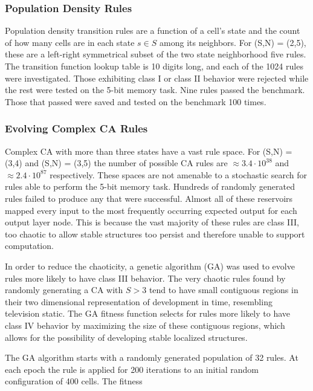 \documentclass{elsarticle}
\begin{document}
\begin{multicols}{2}
\subsubsection{Population Density Rules}
Population density transition rules are a function of a cell's state and the 
    count of how many cells are in each state $s \in S$ among its neighbors. 
    For (S,N) = (2,5), these are a left-right symmetrical subset of the two 
    state neighborhood five rules. The transition function lookup table is 10 
    digits long, and each of the 1024 rules were investigated. Those exhibiting 
    class I or class II behavior were rejected while the rest were tested on 
    the 5-bit memory task. Nine rules passed the benchmark. Those that passed 
    were saved and tested on the benchmark 100 times.

  \subsubsection{Evolving Complex CA Rules}
Complex CA with more than three states have a vast rule space. For (S,N) = 
    (3,4) and (S,N) = (3,5) the number of possible CA rules are $\approx 3.4 \cdot 
    10^38$ and $\approx 2.4 \cdot 10^87$ respectively. These spaces are not 
    amenable to a stochastic search for rules able to perform the 5-bit memory 
    task.  Hundreds of randomly generated rules failed to produce any that were 
    successful. Almost all of these reservoirs mapped every input to the most 
    frequently occurring expected output for each output layer node. This is 
    because the vast majority of these rules are class III, too chaotic to 
    allow stable structures too persist and therefore unable to support 
    computation.\par
In order to reduce the chaoticity, a genetic algorithm (GA) was used to evolve 
rules more likely to have class III behavior. The very chaotic rules found by 
randomly generating a CA with $S > 3$ tend to have small contiguous regions in 
their two dimensional representation of development in time, resembling 
television static.  The GA fitness function selects for rules more likely to 
have class IV behavior by maximizing the size of these contiguous regions, 
     which allows for the possibility of developing stable localized 
     structures. \par The GA algorithm starts with a randomly generated 
     population of 32 rules. At each epoch the rule is applied for 200 
     iterations to an initial random configuration of 400 cells.  The fitness 

\end{multicols}
\end{document}
